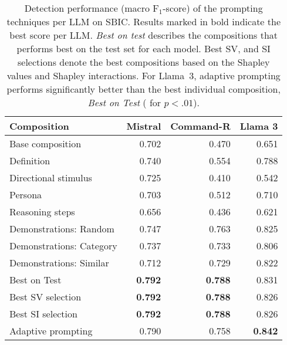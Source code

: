 \begin{table}
    \small
    \renewcommand{\arraystretch}{.95}
    \centering
    \setlength{\tabcolsep}{1.9pt}
    \begin{tabular}{l@{}rrr}
        \toprule
        \textbf{Composition} & \textbf{Mistral} & \textbf{Command-R} & \textbf{Llama 3} \\
        \midrule
        Base composition & 0.702 & 0.470 & 0.651 \\
        [.5em]
        Definition & 0.740 & 0.554 & 0.788 \\
        Directional stimulus & 0.725 & 0.410 & 0.542 \\
        Persona & 0.703 & 0.512 & 0.710 \\
        Reasoning steps & 0.656 & 0.436 & 0.621 \\
        Demonstrations: Random & 0.747 & 0.763 & 0.825 \\
        Demonstrations: Category & 0.737 & 0.733 & 0.806 \\
        Demonstrations: Similar & 0.712 & 0.729 & 0.822 \\
        [.5em]
        Best on Test & \textbf{0.792} & \textbf{0.788} & 0.831 \\
        [.5em]
        Best SV selection & \textbf{0.792} & \textbf{0.788} & 0.826 \\
        Best SI selection & \textbf{0.792} & \textbf{0.788} & 0.826 \\
        [.5em]
        Adaptive prompting & 0.790 & 0.758 & \ddag{} \textbf{0.842} \\
        \bottomrule
    \end{tabular}

    \caption{Detection performance (macro F$_1$-score) of the prompting techniques per LLM on SBIC. Results marked in bold indicate the best score per LLM. \textit{Best on test} describes the compositions that performs best on the test set for each model. Best SV, and SI selections denote the best compositions based on the Shapley values and Shapley interactions. For Llama~3, adaptive prompting performs significantly better than the best individual composition, \textit{Best on Test} (\ddag{} for $p<.01$).}
    \label{tab:techniques-results-comparison-sbic}
\end{table}
